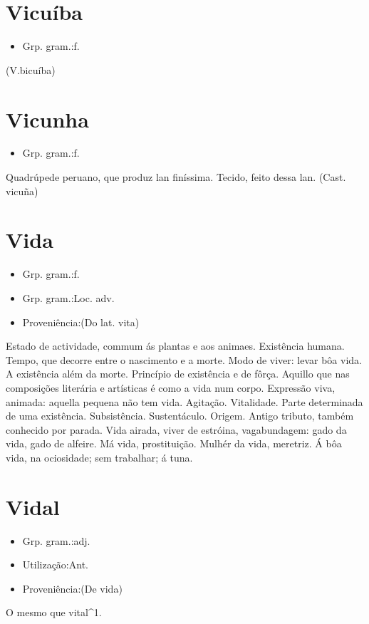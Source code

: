 \documentclass{article}
\begin{document}
\section{Vicuíba}
\begin{itemize}
\item {Grp. gram.:f.}
\end{itemize}
(V.bicuíba)
\section{Vicunha}
\begin{itemize}
\item {Grp. gram.:f.}
\end{itemize}
Quadrúpede peruano, que produz lan finíssima.
Tecido, feito dessa lan.
(Cast. \textunderscore vicuña\textunderscore )
\section{Vida}
\begin{itemize}
\item {Grp. gram.:f.}
\end{itemize}
\begin{itemize}
\item {Grp. gram.:Loc. adv.}
\end{itemize}
\begin{itemize}
\item {Proveniência:(Do lat. \textunderscore vita\textunderscore )}
\end{itemize}
Estado de actividade, commum ás plantas e aos animaes.
Existência humana.
Tempo, que decorre entre o nascimento e a morte.
Modo de viver: \textunderscore levar bôa vida\textunderscore .
A existência além da morte.
Princípio de existência e de fôrça.
Aquillo que nas composições literária e artísticas é como a vida num corpo.
Expressão viva, animada: \textunderscore aquella pequena não tem vida\textunderscore .
Agitação.
Vitalidade.
Parte determinada de uma existência.
Subsistência.
Sustentáculo.
Origem.
Antigo tributo, também conhecido por \textunderscore parada\textunderscore .
\textunderscore Vida airada\textunderscore , viver de estróina, vagabundagem: \textunderscore gado da vida\textunderscore , gado de alfeire.
\textunderscore Má vida\textunderscore , prostituição.
\textunderscore Mulhér da vida\textunderscore , meretriz.
\textunderscore Á bôa vida\textunderscore , na ociosidade; sem trabalhar; á tuna.
\section{Vidal}
\begin{itemize}
\item {Grp. gram.:adj.}
\end{itemize}
\begin{itemize}
\item {Utilização:Ant.}
\end{itemize}
\begin{itemize}
\item {Proveniência:(De \textunderscore vida\textunderscore )}
\end{itemize}
O mesmo que \textunderscore vital\textunderscore ^1.
\end{document}
